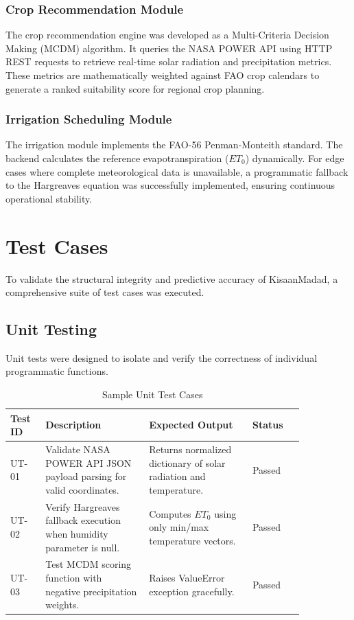 \subsubsection{Crop Recommendation Module}
The crop recommendation engine was developed as a Multi-Criteria Decision Making (MCDM) algorithm. It queries the NASA POWER API using HTTP REST requests to retrieve real-time solar radiation and precipitation metrics. These metrics are mathematically weighted against FAO crop calendars to generate a ranked suitability score for regional crop planning.

\subsubsection{Irrigation Scheduling Module}
The irrigation module implements the FAO-56 Penman-Monteith standard. The backend calculates the reference evapotranspiration ($ET_0$) dynamically. For edge cases where complete meteorological data is unavailable, a programmatic fallback to the Hargreaves equation was successfully implemented, ensuring continuous operational stability.

\section{Test Cases}

To validate the structural integrity and predictive accuracy of KisaanMadad, a comprehensive suite of test cases was executed.

\subsection{Unit Testing}
Unit tests were designed to isolate and verify the correctness of individual programmatic functions.
\begin{table}[htbp]
  \centering
  \caption{Sample Unit Test Cases}
  \begin{tabular}{|p{0.1\linewidth}|p{0.3\linewidth}|p{0.3\linewidth}|p{0.15\linewidth}|}
    \hline
    \textbf{Test ID} & \textbf{Description} & \textbf{Expected Output} & \textbf{Status} \\
    \hline
    UT-01 & Validate NASA POWER API JSON payload parsing for valid coordinates. & Returns normalized dictionary of solar radiation and temperature. & Passed \\
    \hline
    UT-02 & Verify Hargreaves fallback execution when humidity parameter is null. & Computes $ET_0$ using only min/max temperature vectors. & Passed \\
    \hline
    UT-03 & Test MCDM scoring function with negative precipitation weights. & Raises ValueError exception gracefully. & Passed \\
    \hline
  \end{tabular}
\end{table}

